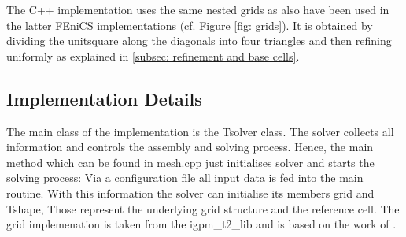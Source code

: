 The C++ implementation uses the same nested grids as also have been used in the latter FEniCS implementations (cf. Figure \ref{fig: grids}). It is obtained by dividing the unitsquare along the diagonals into four triangles and then refining uniformly as explained in \ref{subsec: refinement and base cells}.

\subsection{Implementation Details}

The main class of the implementation is the Tsolver class. The solver collects all information and controls the assembly and solving process.
Hence, the main method which can be found in mesh.cpp just initialises solver and starts the solving process: Via a configuration file all input data is fed into the main routine. With this information the solver can initialise its members grid and Tshape, Those represent the underlying grid structure and the reference cell. 
The grid implemenation is taken from the igpm\_t2\_lib and is based on the work of \cite{BMV2009}.


